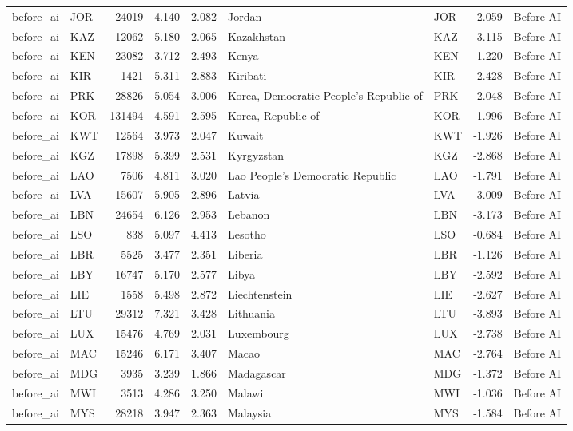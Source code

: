 \begin{tabular}{llrrrllrl}
before\_ai & JOR & 24019 & 4.140 & 2.082 & Jordan & JOR & -2.059 & Before AI \\
before\_ai & KAZ & 12062 & 5.180 & 2.065 & Kazakhstan & KAZ & -3.115 & Before AI \\
before\_ai & KEN & 23082 & 3.712 & 2.493 & Kenya & KEN & -1.220 & Before AI \\
before\_ai & KIR & 1421 & 5.311 & 2.883 & Kiribati & KIR & -2.428 & Before AI \\
before\_ai & PRK & 28826 & 5.054 & 3.006 & Korea, Democratic People's Republic of & PRK & -2.048 & Before AI \\
before\_ai & KOR & 131494 & 4.591 & 2.595 & Korea, Republic of & KOR & -1.996 & Before AI \\
before\_ai & KWT & 12564 & 3.973 & 2.047 & Kuwait & KWT & -1.926 & Before AI \\
before\_ai & KGZ & 17898 & 5.399 & 2.531 & Kyrgyzstan & KGZ & -2.868 & Before AI \\
before\_ai & LAO & 7506 & 4.811 & 3.020 & Lao People's Democratic Republic & LAO & -1.791 & Before AI \\
before\_ai & LVA & 15607 & 5.905 & 2.896 & Latvia & LVA & -3.009 & Before AI \\
before\_ai & LBN & 24654 & 6.126 & 2.953 & Lebanon & LBN & -3.173 & Before AI \\
before\_ai & LSO & 838 & 5.097 & 4.413 & Lesotho & LSO & -0.684 & Before AI \\
before\_ai & LBR & 5525 & 3.477 & 2.351 & Liberia & LBR & -1.126 & Before AI \\
before\_ai & LBY & 16747 & 5.170 & 2.577 & Libya & LBY & -2.592 & Before AI \\
before\_ai & LIE & 1558 & 5.498 & 2.872 & Liechtenstein & LIE & -2.627 & Before AI \\
before\_ai & LTU & 29312 & 7.321 & 3.428 & Lithuania & LTU & -3.893 & Before AI \\
before\_ai & LUX & 15476 & 4.769 & 2.031 & Luxembourg & LUX & -2.738 & Before AI \\
before\_ai & MAC & 15246 & 6.171 & 3.407 & Macao & MAC & -2.764 & Before AI \\
before\_ai & MDG & 3935 & 3.239 & 1.866 & Madagascar & MDG & -1.372 & Before AI \\
before\_ai & MWI & 3513 & 4.286 & 3.250 & Malawi & MWI & -1.036 & Before AI \\
before\_ai & MYS & 28218 & 3.947 & 2.363 & Malaysia & MYS & -1.584 & Before AI \\

\end{tabular}
